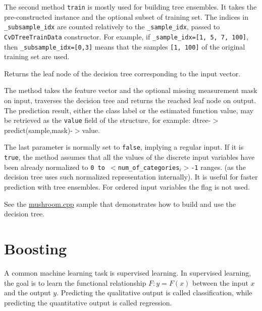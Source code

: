 The second method \texttt{train} is mostly used for building tree ensembles. It takes the pre-constructed  instance and the optional subset of training set. The indices in \texttt{\_subsample\_idx} are counted relatively to the \texttt{\_sample\_idx}, passed to \texttt{CvDTreeTrainData} constructor. For example, if \texttt{\_sample\_idx=[1, 5, 7, 100]}, then \texttt{\_subsample\_idx=[0,3]} means that the samples \texttt{[1, 100]} of the original training set are used.



Returns the leaf node of the decision tree corresponding to the input vector.


The method takes the feature vector and the optional missing measurement mask on input, traverses the decision tree and returns the reached leaf node on output. The prediction result, either the class label or the estimated function value, may be retrieved as the \texttt{value} field of the  structure, for example: dtree-$>$predict(sample,mask)-$>$value.

The last parameter is normally set to \texttt{false}, implying a regular input. If it is \texttt{true}, the method assumes that all the values of the discrete input variables have been already normalized to \texttt{0 to $<$num\_of\_categories$_i>$-1} ranges. (as the decision tree uses such normalized representation internally). It is useful for faster prediction with tree ensembles. For ordered input variables the flag is not used.


See the \href{../../samples/c/mushroom.cpp}{mushroom.cpp} sample that demonstrates how to build and use the decision tree.

\section{Boosting} %

A common machine learning task is supervised learning. In supervised learning, the goal is to learn the functional relationship $F: y = F(x)$ between the input $x$ and the output $y$. Predicting the qualitative output is called classification, while predicting the quantitative output is called regression.

